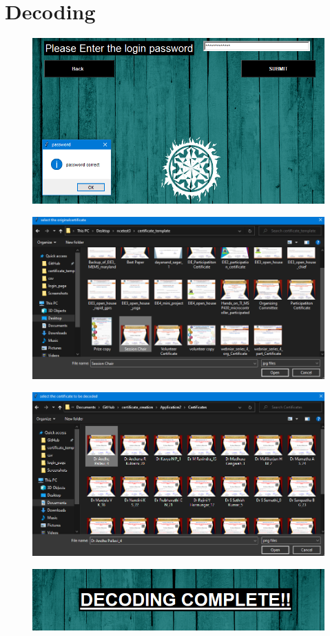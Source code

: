 \chapter{Decoding}


\begin{figure}[H]
	\centering
	\includegraphics[width=0.7\linewidth]{"images/generation_qr_nqr/Screenshot (76)"}
	\label{fig:screenshot-76}
\end{figure}
\begin{figure}[H]
	\centering
	\includegraphics[width=0.7\linewidth]{"images/generation_qr_nqr/Screenshot (77)"}
	\label{fig:screenshot-77}
\end{figure}




\begin{figure}[H]
	\centering
	\includegraphics[width=0.7\linewidth]{"images/generation_qr_nqr/Screenshot (78)"}
	\label{fig:screenshot-78}
\end{figure}
\begin{figure}[H]
	\centering
	\includegraphics[width=0.7\linewidth]{"images/generation_qr_nqr/Screenshot (79)"}
	\label{fig:screenshot-79}
\end{figure}





